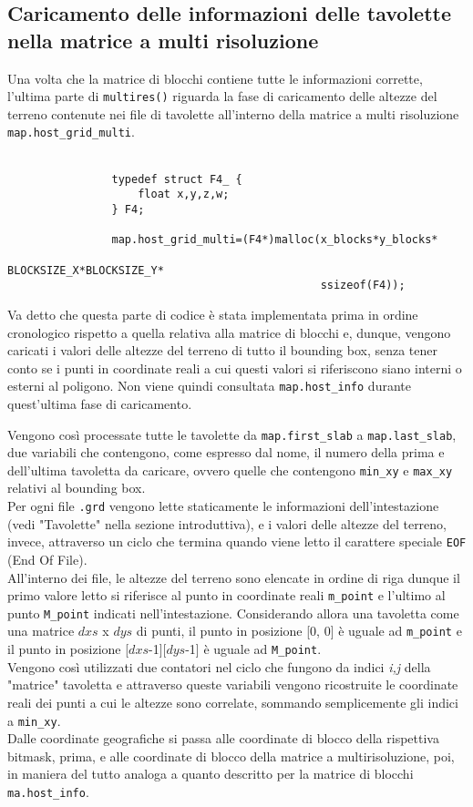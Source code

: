 		\subsection{Caricamento delle informazioni delle tavolette nella matrice a multi risoluzione}
			Una volta che la matrice di blocchi contiene tutte le informazioni corrette, l'ultima parte di \texttt{multires()} riguarda la fase di caricamento delle altezze del terreno contenute nei file di tavolette all'interno della matrice a multi risoluzione \texttt{map.host\_grid\_multi}.\\\\
			\begin{verbatim}
				typedef struct F4_ {
				    float x,y,z,w;
				} F4;

				map.host_grid_multi=(F4*)malloc(x_blocks*y_blocks*
				                                BLOCKSIZE_X*BLOCKSIZE_Y*
				                                ssizeof(F4));
			\end{verbatim}
			Va detto che questa parte di codice \`{e} stata implementata prima in ordine cronologico rispetto a quella relativa alla matrice di blocchi e, dunque, vengono caricati i valori delle altezze del terreno di tutto il bounding box, senza tener conto se i punti in coordinate reali a cui questi valori si riferiscono siano interni o esterni al poligono. Non viene quindi consultata \texttt{map.host\_info} durante quest'ultima fase di caricamento.

			Vengono cos\`{i} processate tutte le tavolette da \texttt{map.first\_slab} a \texttt{map.last\_slab}, due variabili che contengono, come espresso dal nome, il numero della prima e dell'ultima tavoletta da caricare, ovvero quelle che contengono \texttt{min\_xy} e \texttt{max\_xy} relativi al bounding box.\\
			Per ogni file \texttt{.grd} vengono lette staticamente le informazioni dell'intestazione (vedi "Tavolette" nella sezione introduttiva), e i valori delle altezze del terreno, invece, attraverso un ciclo che termina quando viene letto il carattere speciale \texttt{EOF} (End Of File). \\
			All'interno dei file, le altezze del terreno sono elencate in ordine di riga dunque il primo valore letto si riferisce al punto in coordinate reali \texttt{m\_point} e l'ultimo al punto \texttt{M\_point} indicati nell'intestazione. Considerando allora una tavoletta come una matrice $dxs$ x $dys$ di punti, il punto in posizione [0, 0] \`{e} uguale ad \texttt{m\_point} e il punto in posizione [$dxs$-1][$dys$-1] \`{e} uguale ad \texttt{M\_point}. \\
			Vengono cos\`{i} utilizzati due contatori nel ciclo che fungono da indici \textit{i,j} della "matrice" tavoletta e attraverso queste variabili vengono ricostruite le coordinate reali dei punti a cui le altezze sono correlate, sommando semplicemente gli indici a \texttt{min\_xy}.\\
			Dalle coordinate geografiche si passa alle coordinate di blocco della rispettiva bitmask, prima, e alle coordinate di blocco della matrice a multirisoluzione, poi, in maniera del tutto analoga a quanto descritto per la matrice di blocchi \texttt{ma.host\_info}.

